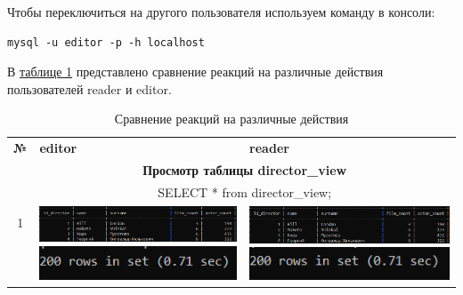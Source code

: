 \documentclass[11pt,a4paper,final]{article} %
\begin{document}
Чтобы переключиться на другого пользователя используем команду в консоли:
\begin{lstlisting}
mysql -u editor -p -h localhost
\end{lstlisting}

В  \hyperref[tab:tb1]{таблице 1} представлено сравнение реакций на различные действия пользователей reader и editor.

\newpage
\begin{table}[H]
\caption{Сравнение реакций на различные действия}
\label{tab:tb1}

\begin{tabularx}{\textwidth}{|c|X|X|}
	\cline{1-3}
	\textbf{№} & \textbf{editor} & \textbf{reader} \\
	\cline{1-3}
	
	\multirow{3}{*}{1} & \multicolumn{2}{c|}{\textbf{Просмотр таблицы director\_view}}\\
	& \multicolumn{2}{c|}{SELECT * from director\_view;}\\
	\cline{2-3}
	& 
	\vspace{-6pt}
	\hspace{-8.5pt}
	\includegraphics[width=1\linewidth]{n1.png}
	\includegraphics[width=1\linewidth]{e1.png}
	& 
	\vspace{-6pt}
	\hspace{-8.5pt}
	\includegraphics[width=1\linewidth]{n1.png}
	\includegraphics[width=1\linewidth]{r1.png}
	\\
	\cline{1-3}
	

\end{tabularx}
\end{table}
\end{document}
